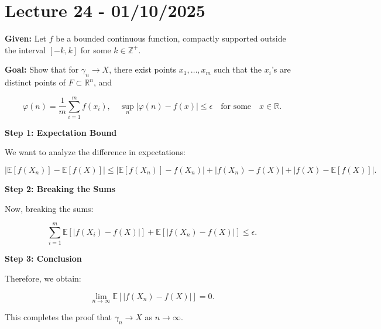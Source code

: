 \documentclass{article}
\newcommand{\1}{\mathds{1}}
\begin{document}
\section{Lecture 24 - 01/10/2025}
\textbf{Given:} Let \( f \) be a bounded continuous function, compactly supported outside the interval \( [-k, k] \) for some \( k \in \mathbb{Z}^+ \).

\textbf{Goal:} Show that for \( \gamma_n \to X \), there exist points \( x_1, \dots, x_m \) such that the \( x_i \)'s are distinct points of \( F \subset \mathbb{R}^n \), and

\[
\varphi(n) = \frac{1}{m} \sum_{i=1}^{m} f(x_i), \quad \sup_{n} \left| \varphi(n) - f(x) \right| \leq \epsilon \quad \text{for some} \quad x \in \mathbb{R}.
\]

\textbf{Step 1: Expectation Bound}

We want to analyze the difference in expectations:

\[
\left| \mathbb{E}[f(X_n)] - \mathbb{E}[f(X)] \right| \leq \left| \mathbb{E}[f(X_n)] - f(X_n) \right| + \left| f(X_n) - f(X) \right| + \left| f(X) - \mathbb{E}[f(X)] \right|.
\]

\textbf{Step 2: Breaking the Sums}

Now, breaking the sums:

\[
\sum_{i=1}^{m} \mathbb{E}[|f(X_i) - f(X)|] + \mathbb{E}[|f(X_n) - f(X)|] \leq \epsilon.
\]

\textbf{Step 3: Conclusion}

Therefore, we obtain:

\[
\lim_{n \to \infty} \mathbb{E}[|f(X_n) - f(X)|] = 0.
\]

This completes the proof that \( \gamma_n \to X \) as \( n \to \infty \).
\end{document}

